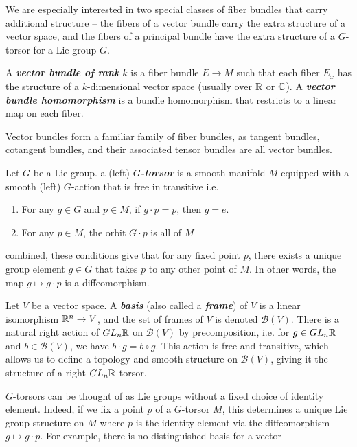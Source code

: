 \documentclass[abstract=on,twoside]{scrreprt}
\begin{document}
We are especially interested in two special classes of fiber bundles that carry
additional structure -- the fibers of a vector bundle carry the extra structure of a
vector space, and the fibers of a principal bundle have the extra structure of a
$G$-torsor for a Lie group $G$.
%
\begin{definition}
A \textbf{\textit{vector bundle of rank}} $k$ is a fiber bundle $E \to M$ such that each
fiber $E_x$ has the structure of a $k$-dimensional vector space (usually over $\mathbb{R}$ or
$\mathbb{C}$). A \textbf{\textit{vector bundle homomorphism}} is a bundle homomorphism that
restricts to a linear map on each fiber.
\end{definition}
%
Vector bundles form a familiar family of fiber bundles, as tangent bundles,
cotangent bundles, and their associated tensor bundles are all vector bundles.
%
\begin{definition}
Let $G$ be a Lie group. a (left) \textbf{\textit{$G$-torsor}} is a smooth manifold $M$
equipped with a smooth (left) $G$-action that is free in transitive i.e.
\begin{enumerate}
	\item For any $g \in G$ and $p \in M$, if $g\cdot p = p$, then $g = e$.
	\item For any $p \in M$, the orbit $G \cdot p$ is all of $M$
\end{enumerate}
combined, these conditions give that for any fixed point $p$, there exists a unique
group element $g \in G$ that takes $p$ to any other point of $M$. In other words,
the map $g \mapsto g \cdot p$ is a diffeomorphism.
\end{definition}
%
\begin{example}
Let $V$ be a vector space. A \textbf{\textit{basis}} (also called a
\textbf{\textit{frame}}) of $V$ is a linear isomorphism $\mathbb{R}^n \to V$, and the
set of frames of $V$ is denoted $\mathcal{B}(V)$. There is a
natural right action of $GL_n\mathbb{R}$ on $\mathcal{B}(V)$ by precomposition, i.e.
for $g \in GL_n\mathbb{R}$ and $b \in \mathcal{B}(V)$, we have $b \cdot g = b \circ g$.
This action is free and transitive, which allows us to define a topology and
smooth structure on $\mathcal{B}(V)$, giving it the structure of a
right $GL_n\mathbb{R}$-torsor.
\end{example}
%
$G$-torsors can be thought of as Lie groups without a fixed choice of identity element.
Indeed, if we fix a point $p$ of a $G$-torsor $M$, this determines a unique Lie group
structure on $M$ where $p$ is the identity element via the diffeomorphism
$g \mapsto g \cdot p$. For example, there is no distinguished basis for a vector
\end{document}
